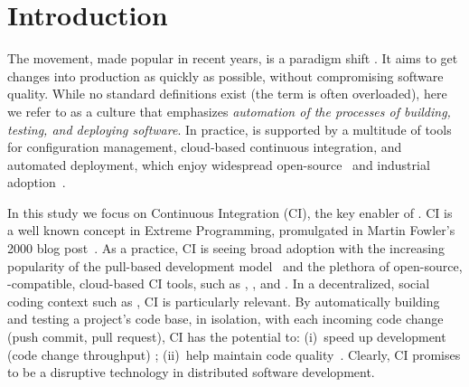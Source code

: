 
\section{Introduction}

The \DO movement, made popular in recent years, is a paradigm shift 
\cite{degrandis2011devops, loukides2012devops, humble2011enterprises, 
roche2013adopting}.
It aims to get changes into production as quickly as 
possible, without compromising software quality.
While no standard definitions exist (the term is often overloaded), here
we refer to \DO as a culture that emphasizes \emph{automation of the 
processes of building, testing, and deploying software}.
In practice, \DO is supported by a multitude of tools for configuration 
management, cloud-based continuous integration, and automated deployment,
which enjoy widespread open-source~\cite{Hilton2016} and industrial 
adoption~\cite{rightscale, hilton2016continuous}.

In this study we focus on Continuous Integration (CI), the key enabler of \DO.
CI is a well known concept in Extreme Programming, promulgated in 
Martin Fowler's 2000 blog post~\cite{fowler2000continuous}.
As a practice, CI is seeing broad adoption with the increasing popularity
of the \GH pull-based development model~\cite{gousios2014exploratory}
and the plethora of open-source, \GH-compatible, cloud-based CI 
tools, %
such as \Tvis, \CB, and \CCI.
In a decentralized, social coding context such as \GH, CI is particularly relevant. 
By automatically building and testing a project's code base, in isolation, 
with each incoming code change (\ie push commit, pull request), CI 
has the potential to: (i)~speed up development (code change throughput)
\cite{Stolberg, pham2013creating, Hilton2016};
(ii)~help maintain code quality~\cite{VasilescuYWDF15, gousios2015work}.
Clearly, CI promises to be a disruptive technology in distributed software
development.

